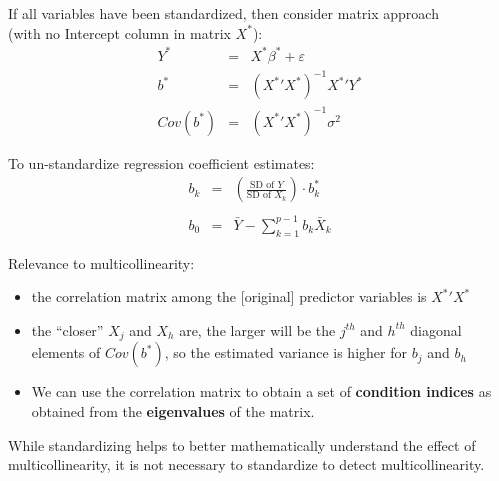 \documentclass[12pt]{notes}
\begin{document}
If all variables have been standardized, then consider matrix approach\\
(with no Intercept column in matrix $X^*$):
\begin{eqnarray}
  Y^* & = & X^* \beta^* + \varepsilon \nonumber \\
  b^* & = & ( {X^*}' X^*)^{-1} {X^*}' Y^* \nonumber \\
  Cov(b^*) & = & ({X^*}' {X^*})^{-1} \sigma^2 \nonumber
\end{eqnarray}

\begin{minipage}[l][2cm][c]{\textwidth}
\end{minipage}

To un-standardize regression coefficient estimates:
\begin{eqnarray}
   b_k & = & \left( \frac{\mbox{SD of $Y$}}{\mbox{SD of $X_k$}} \right) \cdot b^*_k \nonumber \\
    & \nonumber \\
   b_0 & = & \bar{Y} - \sum_{k=1}^{p-1} b_k \bar{X}_k \nonumber
\end{eqnarray}

\nspace
Relevance to multicollinearity:
\begin{itemize}
  \item  the correlation matrix among the [original] predictor variables is ${X^*}'X^*$
  \item  the ``closer'' $X_j$ and $X_h$ are, the larger will be the
$j^{th}$ and $h^{th}$ diagonal elements of $Cov(b^*)$, so the estimated variance
is higher for $b_j$ and $b_h$
\item We can use the correlation matrix to obtain a set of \textbf{condition indices} as obtained from the \textbf{eigenvalues} of the matrix. 
\end{itemize}

\nspace
While standardizing helps to better mathematically understand the effect of multicollinearity, it is not necessary to standardize to detect multicollinearity. 
\nspace


\begin{minipage}[l][2cm][c]{\textwidth}
\end{minipage}
\end{document}
